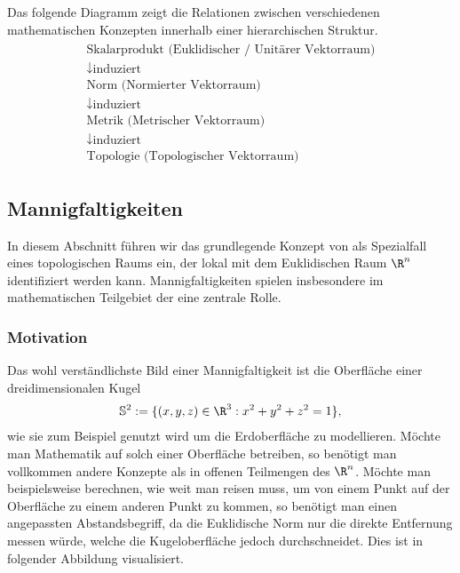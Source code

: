 \documentclass[letterpaper,10pt,english]{jupyterBook}
\begin{document}
\sphinxAtStartPar
Das folgende Diagramm zeigt die Relationen zwischen verschiedenen mathematischen Konzepten innerhalb einer hierarchischen Struktur.
\begin{equation*}
\begin{split}\begin{gathered}
\text{Skalarprodukt (Euklidischer / Unitärer Vektorraum)}\\
\downarrow \text{induziert}\\
\text{Norm (Normierter Vektorraum)}\\
\downarrow \text{induziert}\\             
\text{Metrik (Metrischer Vektorraum)}\\
\downarrow \text{induziert}\\                 
\text{Topologie (Topologischer Vektorraum)}
\end{gathered}\end{split}
\end{equation*}

\subsection{Mannigfaltigkeiten}
\label{\detokenize{manifolds/manifolds_prelim:mannigfaltigkeiten}}\label{\detokenize{manifolds/manifolds_prelim:s-mannigfaltigkeiten}}
\sphinxAtStartPar
In diesem Abschnitt führen wir das grundlegende Konzept von  als Spezialfall eines topologischen Raums ein, der lokal mit dem Euklidischen Raum \(\R^n\) identifiziert werden kann.
Mannigfaltigkeiten spielen insbesondere im mathematischen Teilgebiet der  eine zentrale Rolle.


\subsubsection{Motivation}
\label{\detokenize{manifolds/manifolds_prelim:motivation}}
\sphinxAtStartPar
Das wohl verständlichste Bild einer Mannigfaltigkeit ist die Oberfläche einer dreidimensionalen Kugel
\begin{equation*}
\begin{split}\mathbb{S}^2 := \lbrace (x,y,z)\in\R^3 : x^2 + y^2 + z^2 = 1 \rbrace,\end{split}
\end{equation*}
\sphinxAtStartPar
wie sie zum Beispiel genutzt wird um die Erdoberfläche zu modellieren.
Möchte man Mathematik auf solch einer Oberfläche betreiben, so benötigt man vollkommen andere Konzepte als in offenen Teilmengen des \(\R^n\).
Möchte man beispielsweise berechnen, wie weit man reisen muss, um von einem Punkt auf der Oberfläche zu einem anderen Punkt zu kommen, so benötigt man einen angepassten Abstandsbegriff, da die Euklidische Norm nur die direkte Entfernung messen würde, welche die Kugeloberfläche jedoch durchschneidet.
Dies ist in folgender Abbildung visualisiert.
\end{document}
